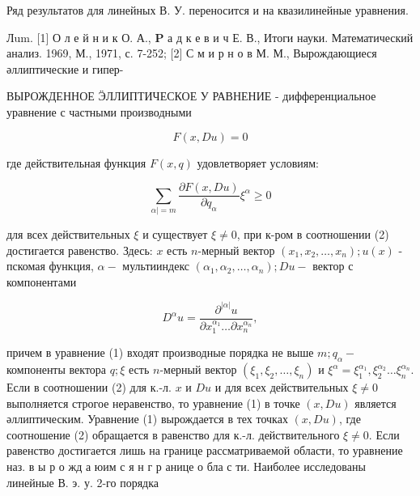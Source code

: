 \documentclass[10pt]{article}
\begin{document}
Ряд результатов для линейных В. У. переносится и на квазилинейные уравнения.



Лum. [1] О л е й н и к О. А., $\mathbf{P}$ а д к е в и ч Е. В., Итоги науки. Математический анализ. 1969, М., 1971, с. 7-252; [2] С м и р н о в М. М., Вырождающиеся әллиптические и гипер-



ВЫРОЖДЕННОЕ ӬЛЛИПТИЧЕСКОЕ У РАВНЕНИЕ - дифференциальное уравнение с частными производными



\[

F(x, D u)=0

\]



где действительная функция $F(x, q)$ удовлетворяет условиям:



\[

\sum_{\alpha \mid=m} \frac{\partial F(x, D u)}{\partial q_{\alpha}} \xi^{\alpha} \geqslant 0

\]



для всех действительных $\xi$ и существует $\xi \neq 0$, при к-ром в соотношении (2) достигается равенство. Здесь: $x$ есть $n$-мерный вектор $\left(x_{1}, x_{2}, \ldots, x_{n}\right) ; u(x)$ - пскомая функция, $\alpha-$ мультииндекс $\left(\alpha_{1}, \alpha_{2}, \ldots, \alpha_{n}\right) ; D u-$ вектор с компонентами



\[

D^{\alpha} u=\frac{\partial^{|\alpha|} u}{\partial x_{1}^{\alpha_{1}} \ldots \partial x_{n}^{\alpha_{n}}},

\]



причем в уравнение (1) входят производные порядка не выше $m ; q_{\alpha}-$ компоненты вектора $q ; \xi$ есть $n$-мерный вектор $\left(\xi_{1}, \xi_{2}, \ldots, \xi_{n}\right)$ и $\xi^{\alpha}=\xi_{1}^{\alpha_{1}}, \xi_{2}^{\alpha_{2}} \ldots \xi_{n}^{\alpha_{n}}$. Если в соотношении (2) для к.-л. $x$ и $D u$ и для всех действительных $\xi \neq 0$ выполняется строгое неравенство, то уравнение (1) в точке $(x, D u)$ является әллиптическим. Уравнение (1) вырождается в тех точках $(x, D u)$, где соотношение (2) обращается в равенство для к.-л. действительного $\xi \neq 0$. Если равенство достигается лишь на границе рассматриваемой области, то уравнение наз. в ы р о жд а юим с я н г р анице о бла с ти. Наиболее исследованы линейные В. э. у. 2-го порядка
\end{document}
